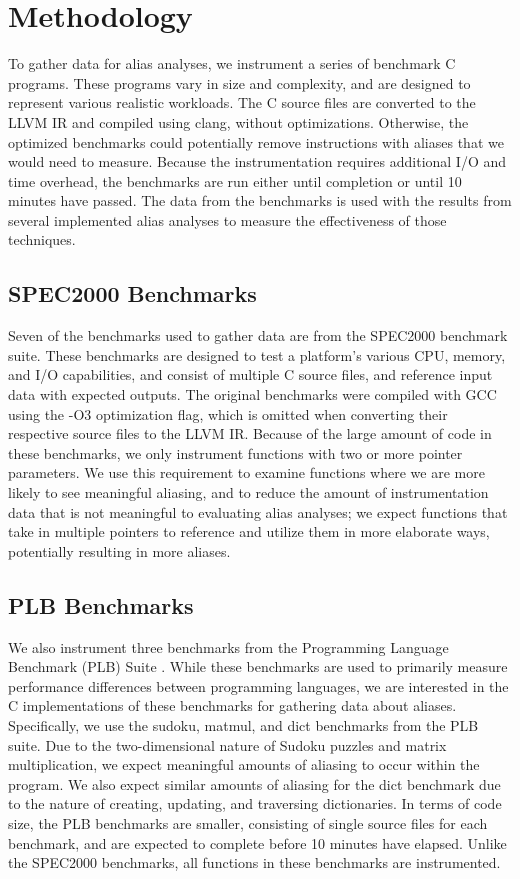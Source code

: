\chapter{Methodology}

To gather data for alias analyses, we instrument a series of benchmark C programs. These programs vary in size and complexity, and are designed to represent various realistic workloads. The C source files are converted to the LLVM IR and compiled using clang, without optimizations. Otherwise, the optimized benchmarks could potentially remove instructions with aliases that we would need to measure. Because the instrumentation requires additional I/O and time overhead, the benchmarks are run either until completion or until 10 minutes have passed. The data from the benchmarks is used with the results from several implemented alias analyses to measure the effectiveness of those techniques.

\section{SPEC2000 Benchmarks}
Seven of the benchmarks used to gather data are from the SPEC2000 benchmark suite. These benchmarks are designed to test a platform's various CPU, memory, and I/O capabilities, and consist of multiple C source files, and reference input data with expected outputs. The original benchmarks were compiled with GCC using the -O3 optimization flag, which is omitted when converting their respective source files to the LLVM IR. Because of the large amount of code in these benchmarks, we only instrument functions with two or more pointer parameters. We use this requirement to examine functions where we are more likely to see meaningful aliasing, and to reduce the amount of instrumentation data that is not meaningful to evaluating alias analyses; we expect functions that take in multiple pointers to reference and utilize them in more elaborate ways, potentially resulting in more aliases.

\section{PLB Benchmarks}
We also instrument three benchmarks from the Programming Language Benchmark (PLB) Suite \cite{plb}. While these benchmarks are used to primarily measure performance differences between programming languages, we are interested in the C implementations of these benchmarks for gathering data about aliases. Specifically, we use the sudoku, matmul, and dict benchmarks from the PLB suite. Due to the two-dimensional nature of Sudoku puzzles and matrix multiplication, we expect meaningful amounts of aliasing to occur within the program. We also expect similar amounts of aliasing for the dict benchmark due to the nature of creating, updating, and traversing dictionaries. In terms of code size, the PLB benchmarks are smaller, consisting of single source files for each benchmark, and are expected to complete before 10 minutes have elapsed. Unlike the SPEC2000 benchmarks, all functions in these benchmarks are instrumented.


